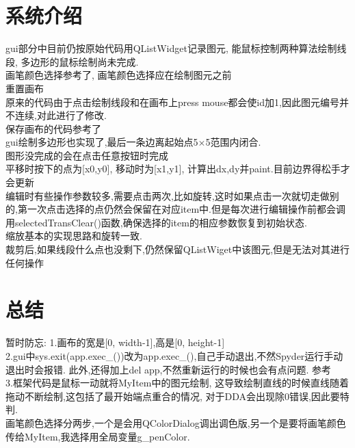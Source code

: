 \documentclass[a4paper,UTF8]{article}
\theoremstyle{definition}
\begin{document}
\section{系统介绍}
gui部分中目前仍按原始代码用QListWidget记录图元, 能鼠标控制两种算法绘制线段,
多边形的鼠标绘制尚未完成.\\
画笔颜色选择参考了\cite{pyqt5_ch}, 画笔颜色选择应在绘制图元之前\\
重置画布\\
原来的代码由于点击绘制线段和在画布上press mouse都会使id加1,因此图元编号并不连续,对此进行了修改.\\
保存画布的代码参考了\cite{save_canvas}\\
gui绘制多边形也实现了,最后一条边离起始点5$\times$5范围内闭合.\\
图形没完成的会在点击任意按钮时完成\\
平移时按下的点为[x0,y0], 移动时为[x1,y1], 计算出dx,dy并paint.目前边界得松手才会更新\\
编辑时有些操作参数较多,需要点击两次,比如旋转,这时如果点击一次就切走做别的,第一次点击选择的点仍然会保留在对应item中.但是每次进行编辑操作前都会调用selectedTransClear()函数,确保选择的item的相应参数恢复到初始状态.\\
缩放基本的实现思路和旋转一致.\\
裁剪后,如果线段什么点也没剩下,仍然保留QListWiget中该图元,但是无法对其进行任何操作\\
\section{总结}
暂时防忘:
\indent 1.画布的宽是[0, width-1],高是[0, height-1]\\

\indent 2.gui中sys.exit(app.exec\_())改为app.exec\_(),自己手动退出,不然Spyder运行手动退出时会报错.
此外,还得加上del app,不然重新运行的时候也会有点问题.
参考\cite{exit}\\

\indent 3.框架代码是鼠标一动就将MyItem中的图元绘制,
这导致绘制直线的时候直线随着拖动不断绘制,这包括了最开始端点重合的情况,
对于DDA会出现除0错误,因此要特判.\\

\indent 画笔颜色选择分两步,一个是会用QColorDialog调出调色版,另一个是要将画笔颜色传给MyItem,我选择用全局变量g\_penColor.\\

%

\end{document}
